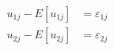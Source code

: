 \documentclass[border=1pt]{standalone}
\begin{document}
$\displaystyle \begin{aligned}u_{1j}-E[u_{1j}]&=\varepsilon_{1j}\\u_{2j}-E[u_{2j}]&=\varepsilon_{2j}\end{aligned}$
\end{document}
